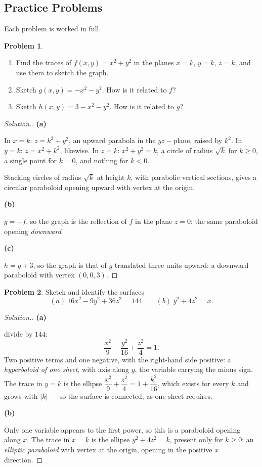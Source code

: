 \documentclass[11pt,a4paper]{article}
\theoremstyle{definition}
\newtheorem{problemx}{Problem}[subsection]
\newenvironment{problem}{\begin{problemx}}{\end{problemx}}
\newenvironment{solution}
  {\renewcommand{\qedsymbol}{}\begin{proof}[\textit{Solution}.]}
  {\end{proof}}
\newcommand{\subhead}[1]{%
  \par\medskip\noindent\textbf{#1}\par\nobreak\smallskip}
\begin{document}
\subsection{Practice Problems}

Each problem is worked in full.

\begin{problem}
\begin{enumerate}
\item[(a)] Find the traces of $f(x,y) = x^2+y^2$ in the planes $x=k$, $y=k$,
$z=k$, and use them to sketch the graph.
\item[(b)] Sketch $g(x,y) = -x^2-y^2$. How is it related to $f$?
\item[(c)] Sketch $h(x,y) = 3-x^2-y^2$. How is it related to $g$?
\end{enumerate}
\end{problem}
\begin{solution}
\subhead{(a)}
In $x=k$: $z = k^2+y^2$, an upward parabola in the $yz-$plane, raised by $k^2$.
In $y=k$: $z = x^2+k^2$, likewise. In $z=k$: $x^2+y^2 = k$, a circle of radius
$\sqrt k$ for $k\geq 0$, a single point for $k=0$, and nothing for $k<0$.

Stacking circles of radius $\sqrt k$ at height $k$, with parabolic vertical
sections, gives a circular paraboloid opening upward with vertex at the origin.

\subhead{(b)}
$g = -f$, so the graph is the reflection of $f$ in the plane $z=0$: the same
paraboloid opening \emph{downward}.

\subhead{(c)}
$h = g+3$, so the graph is that of $g$ translated three units upward: a
downward paraboloid with vertex $(0,0,3)$.
\end{solution}

\begin{problem}
Sketch and identify the surfaces
\[(a)\ 16x^2-9y^2+36z^2 = 144\qquad (b)\ y^2+4z^2 = x .\]
\end{problem}
\begin{solution}
\subhead{(a)}
divide by $144$:
\[\frac{x^2}{9} - \frac{y^2}{16} + \frac{z^2}{4} = 1 .\]
Two positive terms and one negative, with the right-hand side positive: a
\emph{hyperboloid of one sheet}, with axis along $y$, the variable carrying the
minus sign. The trace in $y=k$ is the ellipse
$\dfrac{x^2}{9}+\dfrac{z^2}{4} = 1+\dfrac{k^2}{16}$, which exists for every $k$
and grows with $\left|k\right|$ --- so the surface is connected, as one sheet
requires.

\subhead{(b)}
Only one variable appears to the first power, so this is a paraboloid opening
along $x$. The trace in $x=k$ is the ellipse $y^2+4z^2 = k$, present only for
$k\geq 0$: an \emph{elliptic paraboloid} with vertex at the origin, opening in
the positive $x$ direction.
\end{solution}
\end{document}
